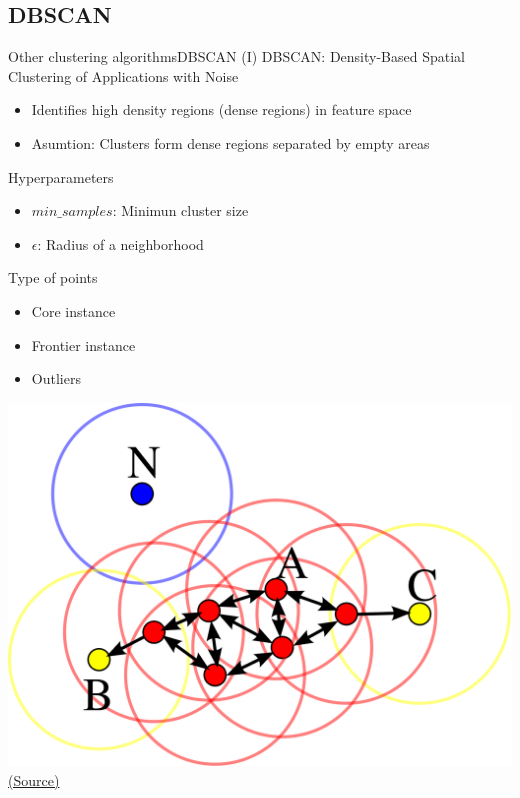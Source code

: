 \documentclass[10pt,compress]{beamer} %
\begin{document}
\subsection{DBSCAN}

\begin{frame}{Other clustering algorithms}{DBSCAN (I)}
	DBSCAN: Density-Based Spatial Clustering of Applications with Noise
	\begin{itemize}
		\item Identifies high density regions (dense regions) in feature space
        \item Asumtion: Clusters form dense regions separated by empty areas
	\end{itemize}
    Hyperparameters
    \begin{itemize}
        \item $min\_samples$: Minimun cluster size
        \item $\epsilon$: Radius of a neighborhood
    \end{itemize}

    Type of points
    \begin{itemize}
        \item Core instance
        \item Frontier instance
        \item Outliers
    \end{itemize}

    \vspace{-3.7cm}
	\begin{flushright} 
        \includegraphics[width=0.5\linewidth]{figs/dbscan.png}\\
	    \scriptsize\href{https://en.wikipedia.org/wiki/DBSCAN}{(Source)}\hspace{10cm}
    \end{flushright}
\end{frame}

\end{document}
